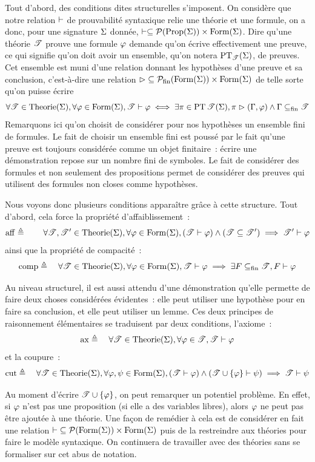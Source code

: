 Tout d'abord, des conditions dites structurelles s'imposent. On considère que
notre relation $\vdash$ de prouvabilité syntaxique relie une théorie et une
formule, on a donc, pour une signature $\Sigma$ donnée,
$\vdash \subseteq \mathcal{P}(\operatorname{Prop}(\Sigma))\times \operatorname{Form}(\Sigma)$. Dire qu'une
théorie $\mathscr T$ prouve une formule $\varphi$ demande qu'on écrive effectivement
une preuve, ce qui signifie qu'on doit avoir un ensemble, qu'on notera
$\operatorname{PT}_{\mathscr T}(\Sigma)$, de preuves. Cet ensemble est muni d'une relation
donnant les hypothèses d'une preuve et sa conclusion, c'est-à-dire une relation
$\mathord{\mathrel{\rhd}}\subseteq\mathcal{P}_{\mathrm{fin}}(\operatorname{Form}(\Sigma))\times\operatorname{Form}(\Sigma)$
de telle sorte qu'on puisse écrire
\[\forall \mathscr T \in \operatorname{Theorie}(\Sigma), \forall \varphi\in\operatorname{Form}(\Sigma),
\mathscr T \vdash \varphi \iff
\exists \pi \in \operatorname{PT}{\mathscr T}(\Sigma), \pi \mathrel{\rhd} (\Gamma,\varphi) \land
\Gamma\subseteq_{\mathrm{fin}}\mathscr T\]
Remarquons ici qu'on choisit de considérer pour nos hypothèses un
ensemble fini de formules. Le fait de choisir un ensemble fini est poussé par
le fait qu'une preuve est toujours considérée comme un objet finitaire~: écrire
une démonstration repose sur un nombre fini de symboles. Le fait de considérer
des formules et non seulement des propositions permet de considérer des preuves
qui utilisent des formules non closes comme hypothèses.

Nous voyons donc plusieurs conditions apparaître grâce à cette structure.
Tout d'abord, cela force la propriété d'affaiblissement~:
\[
\operatorname{aff}\triangleq\quad \quad \forall \mathscr T,\mathscr T'\in\operatorname{Theorie}(\Sigma),
\forall\varphi\in\operatorname{Form}(\Sigma),
(\mathscr T \vdash \varphi) \land (\mathscr T \subseteq \mathscr T') \implies
\mathscr T' \vdash \varphi
\]
ainsi que la propriété de compacité~:
\[
\operatorname{comp}\triangleq\quad \forall \mathscr T\in\operatorname{Theorie}(\Sigma),
\forall\varphi\in\operatorname{Form}(\Sigma),
\mathscr T\vdash\varphi\implies \exists F\subseteq_{\mathrm{fin}}\mathscr T,F\vdash\varphi
\]

Au niveau structurel, il est aussi attendu d'une démonstration qu'elle permette
de faire deux choses considérées évidentes~: elle peut utiliser une hypothèse
pour en faire sa conclusion, et elle peut utiliser un lemme. Ces deux principes
de raisonnement élémentaires se traduisent par deux conditions, l'axiome~:
\[
\operatorname{ax} \triangleq\quad \forall \mathscr T\in\operatorname{Theorie}(\Sigma),
\forall\varphi\in\mathscr T,\mathscr T\vdash\varphi\]
et la coupure~:
\[
\operatorname{cut} \triangleq\quad \forall \mathscr T\in\operatorname{Theorie}(\Sigma),
\forall \varphi,\psi\in\operatorname{Form}(\Sigma),
(\mathscr T\vdash\varphi)\land(\mathscr T\cup\{\varphi\}\vdash\psi)\implies
\mathscr T\vdash\psi
\]

\begin{remark}
  Au moment d'écrire $\mathscr T\cup\{\varphi\}$, on peut remarquer un potentiel
  problème. En effet, si $\varphi$ n'est pas une proposition (si elle a des
  variables libres), alors $\varphi$ ne peut pas être ajoutée à une théorie. Une
  façon de remédier à cela est de considérer en fait une relation
  $\mathord{\vdash}\subseteq\mathcal{P}(\operatorname{Form}(\Sigma))\times\operatorname{Form}(\Sigma)$ puis
  de la restreindre aux théories pour faire  le modèle
  syntaxique. On continuera de travailler avec des théories sans se formaliser
  sur cet abus de notation.
\end{remark}

